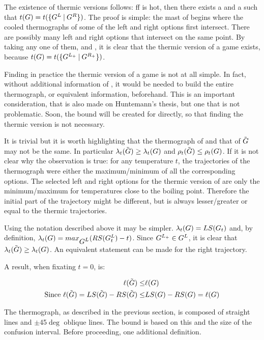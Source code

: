 The existence of thermic versions follows: ff \Gm{} is hot, then there exists a  and a  such that \mbox{$t(G) = t(\mbox{$\{\mbox{$G^L$}\:|\:\mbox{$G^R$}\}$})$}. The proof is simple: the mast of \Gm{} begins where the cooled thermographs of some of the left and right options first intersect. There are possibly many left and right options that intersect on the same point. By taking any one of them,  and , it is clear that the thermic version of a game exists, because $t(G) = t(\mbox{$\{\mbox{$G^{L_+}$}\:|\:\mbox{$G^{R_+}$}\}$})$.

Finding in practice the thermic version of a game is not at all simple. In fact, without additional information of \Gm{}, it would be needed to build the entire thermograph, or equivalent information, beforehand. This is an important consideration, that is also made on Huntemann's thesis, but one that is not problematic. Soon, the bound will be created for \Gm{} directly, so that finding the thermic version is not necessary.

It is trivial but it is worth highlighting that the thermograph of \Gm{} and that of $\tilde{\mbox{$G$}}$ may not be the same. In particular $\lambda_t(\tilde{\mbox{$G$}}) \ge \lambda_t(\mbox{$G$})$ and $\rho_t(\tilde{\mbox{$G$}}) \leq \rho_t(\mbox{$G$})$. If it is not clear why the observation is true: for any temperature $t$, the trajectories of the thermograph were either the maximum/minimum of all the corresponding options. The selected left and right options for the thermic version of \Gm{} are only the minimum/maximum for temperatures close to the boiling point. Therefore the initial part of the trajectory might be different, but is always lesser/greater or equal to the thermic trajectories.

Using the notation described above it may be simpler. $\lambda_t(\mbox{$G$}) = LS(\mbox{$G_t$})$ and, by definition, $\lambda_t(\mbox{$G$}) = max_{\mbox{$G^L$}}(RS(\mbox{$G^L_t$}) - t)$. Since $\mbox{$G^{L_+}$} \in \mbox{$G^L$}$, it is clear that $\lambda_t(\tilde{\mbox{$G$}}) \ge \lambda_t(\mbox{$G$})$. An equivalent statement can be made for the right trajectory.

A result, when fixating $t=0$, is:

\begin{align*}
\ell(\tilde{\mbox{$G$}}) \leq& \ell(\mbox{$G$})\\
\text{Since } \ell(\tilde{\mbox{$G$}}) = LS(\tilde{\mbox{$G$}}) - RS(\tilde{\mbox{$G$}})\leq& LS(\mbox{$G$}) - RS(\mbox{$G$}) = \ell(\mbox{$G$})
\end{align*}

The thermograph, as described in the previous section, is composed of straight lines and $\pm$45$\deg$ oblique lines. The bound is based on this and the size of the confusion interval. Before proceeding, one additional definition.


